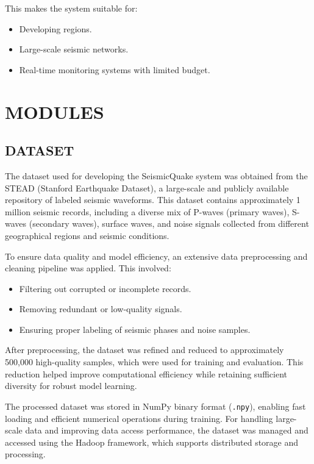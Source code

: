 \documentclass[a4paper,12pt]{report}
\begin{document}
This makes the system suitable for:
\begin{itemize}
\item Developing regions.
\item Large-scale seismic networks.
\item Real-time monitoring systems with limited budget.
\end{itemize}

\section{MODULES}
\label{sec:modules}

\subsection{DATASET}
\label{ssec:dataset}

The dataset used for developing the SeismicQuake system was obtained from the STEAD (Stanford Earthquake Dataset), a large-scale and publicly available repository of labeled seismic waveforms. This dataset contains approximately 1 million seismic records, including a diverse mix of P-waves (primary waves), S-waves (secondary waves), surface waves, and noise signals collected from different geographical regions and seismic conditions.

To ensure data quality and model efficiency, an extensive data preprocessing and cleaning pipeline was applied. This involved:
\begin{itemize}
\item Filtering out corrupted or incomplete records.
\item Removing redundant or low-quality signals.
\item Ensuring proper labeling of seismic phases and noise samples.
\end{itemize}

After preprocessing, the dataset was refined and reduced to approximately 500,000 high-quality samples, which were used for training and evaluation. This reduction helped improve computational efficiency while retaining sufficient diversity for robust model learning.

The processed dataset was stored in NumPy binary format (\texttt{.npy}), enabling fast loading and efficient numerical operations during training. For handling large-scale data and improving data access performance, the dataset was managed and accessed using the Hadoop framework, which supports distributed storage and processing.
\end{document}
